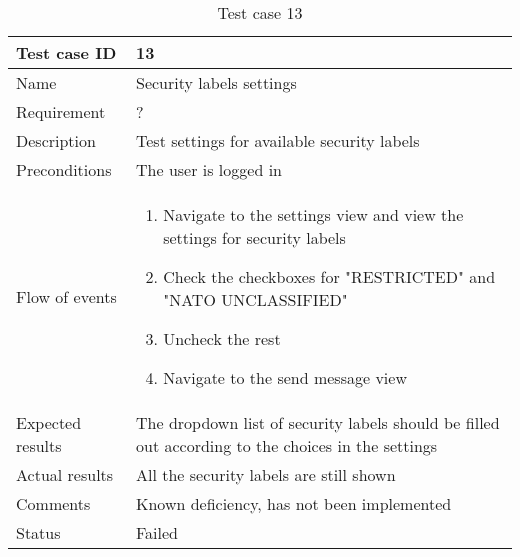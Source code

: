 		\begin{table}[htb]
			\begin{tabular}{l|p{10cm}}
				Test case ID & 13\\ \hline
				Name & Security labels settings\\ \hline
				Requirement & ?\\ \hline
				Description & Test settings for available security labels\\ \hline
				Preconditions & The user is logged in\\ \hline
				Flow of events & 
					\begin{enumerate}
						\item{}Navigate to the settings view and view the settings for security labels
						\item{}Check the checkboxes for "RESTRICTED" and "NATO UNCLASSIFIED"
						\item{}Uncheck the rest
						\item{}Navigate to the send message view
					\end{enumerate} \\ \hline
				Expected results & The dropdown list of security labels should be filled out according to the choices in the settings \\ \hline
				Actual results &All the security labels are still shown\\ \hline
				Comments & Known deficiency, has not been implemented\\ \hline
				Status &Failed\\ \hline
			\end{tabular}
			\caption{Test case 13} \label{tab:case13}
		\end{table}

